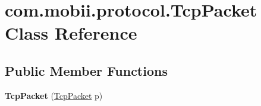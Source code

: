 \hypertarget{classcom_1_1mobii_1_1protocol_1_1_tcp_packet}{\section{com.\-mobii.\-protocol.\-Tcp\-Packet Class Reference}
\label{classcom_1_1mobii_1_1protocol_1_1_tcp_packet}
}
\subsection*{Public Member Functions}
\begin{DoxyCompactItemize}
\item 
\hypertarget{classcom_1_1mobii_1_1protocol_1_1_tcp_packet_a7dee0ef5de06871e1a7c977338af9903}{{\bfseries Tcp\-Packet} (\hyperlink{classcom_1_1mobii_1_1protocol_1_1_tcp_packet}{Tcp\-Packet} p)}\label{classcom_1_1mobii_1_1protocol_1_1_tcp_packet_a7dee0ef5de06871e1a7c977338af9903}


\end{DoxyCompactItemize}
